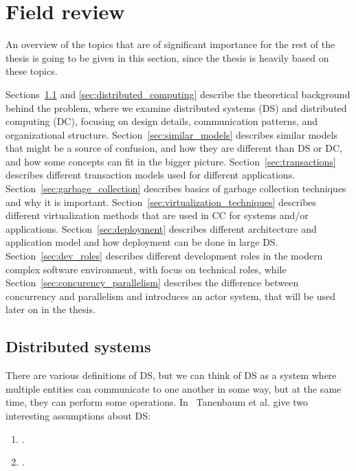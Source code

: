 \chapter{Field review}\label{chapter:Field_overview}
%
An overview of the topics that are of significant importance for the rest of the thesis is going to be given in this section, since the thesis is heavily based on these topics. 

Sections~\ref{sec:distributed_systems} and \ref{sec:distributed_computing} describe the theoretical background behind the problem, where we examine distributed systems (DS) and distributed computing (DC), focusing on design details, communication patterns, and organizational structure. Section~\ref{sec:similar_models} describes similar models that might be a source of confusion, and how they are different than DS or DC, and how some concepts can fit in the bigger picture. Section~\ref{sec:transactions} describes different transaction models used for different applications. Section~\ref{sec:garbage_collection} describes basics of garbage collection techniques and why it is important. Section~\ref{sec:virtualization_techniques} describes different virtualization methods that are used in CC for systems and/or applications. Section~\ref{sec:deployment} describes different architecture and application model and how deployment can be done in large DS. Section~\ref{sec:dev_roles} describes different development roles in the modern complex software environment, with focus on technical roles, while Section~\ref{sec:concurency_parallelism} describes the difference between concurrency and parallelism and introduces an actor system, that will be used later on in the thesis. 

\section{Distributed systems}\label{sec:distributed_systems}
%
There are various definitions of DS, but we can think of DS as a system where multiple entities can communicate to one another in some way, but at the same time, they can perform some operations. In~\cite{SteenT16, 0019513} Tanenbaum et al. give two interesting assumptions about DS:

\begin{enumerate}[start=1,label={(\bfseries \arabic*)}]
	\item  {}.
	\item {}.\label{ds:asumption_2}
\end{enumerate}

